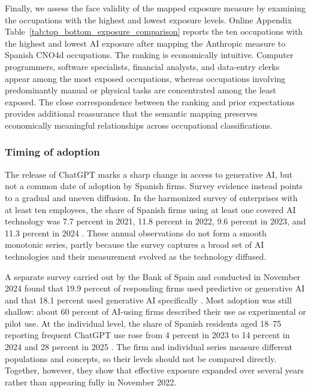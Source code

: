 \documentclass[11pt]{article}
\begin{document}
Finally, we assess the face validity of the mapped exposure measure by examining the occupations with the highest and lowest exposure levels. Online Appendix Table~\ref{tab:top_bottom_exposure_comparison} reports the ten occupations with the highest and lowest AI exposure after mapping the Anthropic measure to Spanish CNO4d occupations. The ranking is economically intuitive. Computer programmers, software specialists, financial analysts, and data-entry clerks appear among the most exposed occupations, whereas occupations involving predominantly manual or physical tasks are concentrated among the least exposed. The close correspondence between the ranking and prior expectations provides additional reassurance that the semantic mapping preserves economically meaningful relationships across occupational classifications.

\subsubsection{Timing of adoption}
\label{sec:adoption_timing}

The release of ChatGPT marks a sharp change in access to generative AI, but not a common date of adoption by Spanish firms. Survey evidence instead points to a gradual and uneven diffusion. In the harmonized survey of enterprises with at least ten employees, the share of Spanish firms using at least one covered AI technology was 7.7 percent in 2021, 11.8 percent in 2022, 9.6 percent in 2023, and 11.3 percent in 2024 \citep{ontsi_ai_bigdata_2023,ontsi_ai_indicators_2024,bde_ai_adoption_2025}. These annual observations do not form a smooth monotonic series, partly because the survey captures a broad set of AI technologies and their measurement evolved as the technology diffused.

A separate survey carried out by the Bank of Spain and conducted in November 2024 found that 19.9 percent of responding firms used predictive or generative AI and that 18.1 percent used generative AI specifically \citep{bde_ai_adoption_2025}. Most adoption was still shallow: about 60 percent of AI-using firms described their use as experimental or pilot use. At the individual level, the share of Spanish residents aged 18--75 reporting frequent ChatGPT use rose from 4 percent in 2023 to 14 percent in 2024 and 28 percent in 2025 \citep{funcas_ai_survey_2026}. The firm and individual series measure different populations and concepts, so their levels should not be compared directly. Together, however, they show that effective exposure expanded over several years rather than appearing fully in November 2022.
\end{document}
